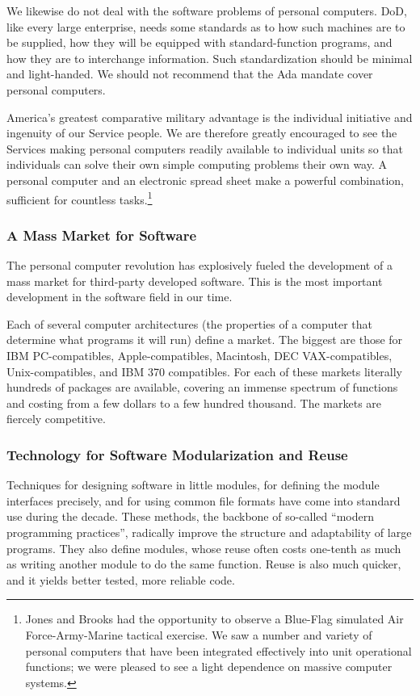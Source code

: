 \documentclass[12pt,final]{article}
\begin{document}
We likewise do not deal with the software problems of personal computers. DoD,
like every large enterprise, needs some standards as to how such machines are
to be supplied, how they will be equipped with standard-function programs, and
how they are to interchange information. Such standardization should be
minimal and light-handed. We should not recommend that the Ada mandate cover
personal computers. %

America’s greatest comparative military advantage is the individual initiative
and ingenuity of our Service people. We are therefore greatly encouraged to see
the Services making personal computers readily available to individual units so
that individuals can solve their own simple computing problems their own way. A
personal computer and an electronic spread sheet make a powerful combination,
sufficient for countless tasks.\footnote{Jones and Brooks had the opportunity
to observe a Blue-Flag simulated Air Force-Army-Marine tactical exercise. We
saw a number and variety of personal computers that have been integrated
effectively into unit operational functions; we were pleased to see a light
dependence on massive computer systems.}

\subsubsection*{A Mass Market for Software}

The personal computer revolution has explosively fueled the development of a
mass market for third-party developed software. This is the most important
development in the software field in our time.

Each of several computer architectures (the properties of a computer that
determine what programs it will run) define a market. The biggest are those for
IBM PC-compatibles, Apple-compatibles, Macintosh, DEC VAX-compatibles,
Unix-compatibles, and IBM 370 compatibles. For each of these markets literally
hundreds of packages are available, covering an immense spectrum of functions
and costing from a few dollars to a few hundred thousand. The markets are
fiercely competitive.

\subsubsection*{Technology for Software Modularization and Reuse}

Techniques for designing software in little modules, for defining the module
interfaces precisely, and for using common file formats have come into standard
use during the decade. These methods, the backbone of so-called “modern
programming practices”, radically improve the structure and adaptability of
large programs. They also define modules, whose reuse often costs one-tenth as
much as writing another module to do the same function. Reuse is also much
quicker, and it yields better tested, more reliable code.
\end{document}
